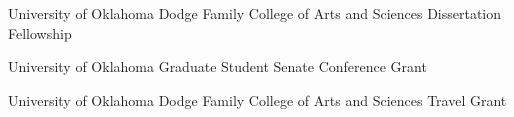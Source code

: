 
{%
	University of Oklahoma}
{%
	Dodge Family College of Arts and Sciences Dissertation Fellowship}
{}

{%
	University of Oklahoma}
{%
	Graduate Student Senate Conference Grant}
{}


{%
	University of Oklahoma}
{%
	Dodge Family College of Arts and Sciences Travel Grant}
{}

